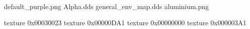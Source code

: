 default_purple.png
Alpha.dds
general_env_map.dds
aluminium.png



texture 0x00030023
texture 0x00000DA1
texture 0x00000000
texture 0x000003A1
